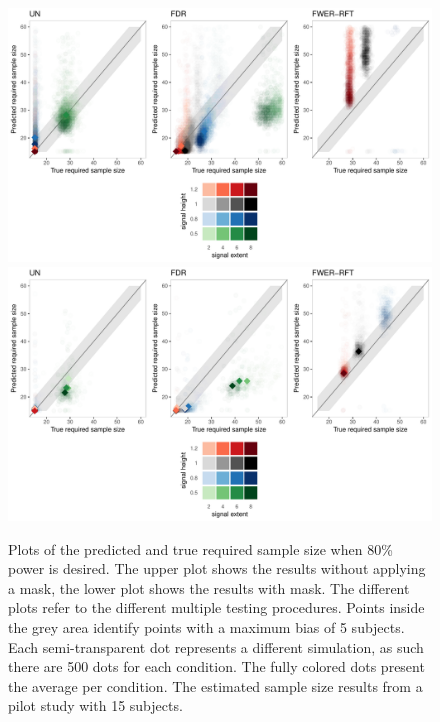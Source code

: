 \begin{center}
\begin{figure}[h]
\includegraphics[scale=0.5]{figures/FIG_SIM_sscalc_15_NOMASK_2_5.pdf}
\includegraphics[scale=0.5]{figures/FIG_SIM_sscalc_15_MASK_2_5.pdf}
\caption{Plots of the predicted and true required sample size when 80\% power is desired. The upper plot shows the results without applying a mask, the lower plot shows the results with mask.  The different plots refer to the different multiple testing procedures.  Points inside the grey area identify points with a maximum bias of 5 subjects.  Each semi-transparent dot represents a different simulation, as such there are 500 dots for each condition.  The fully colored dots present the average per condition.  The estimated sample size results from a pilot study with 15 subjects. \label{SIM_ss}}
\end{figure}
\end{center}
